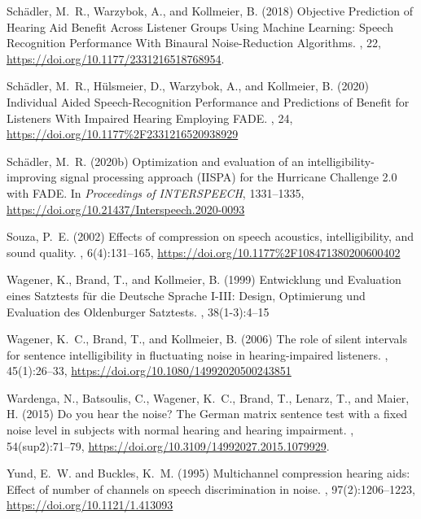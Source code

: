 \documentclass[10pt,a4paper,twocolumn]{article}
\begin{document}
\begin{thebibliography}{}
	Schädler, M.~R., Warzybok, A., and Kollmeier, B. (2018)
	\newblock Objective Prediction of Hearing Aid Benefit Across Listener Groups Using Machine Learning: Speech Recognition Performance With Binaural Noise-Reduction Algorithms.
	, 22, \url{https://doi.org/10.1177/2331216518768954}.
		
	Schädler, M.~R., Hülsmeier, D., Warzybok, A., and Kollmeier, B. (2020)
	\newblock Individual Aided Speech-Recognition Performance and Predictions of Benefit for Listeners With Impaired Hearing Employing FADE.
	, 24, \url{https://doi.org/10.1177%2F2331216520938929}
	
	Schädler, M.~R. (2020b)
	\newblock Optimization and evaluation of an intelligibility-improving signal processing approach (IISPA) for the Hurricane Challenge 2.0 with FADE.
	\newblock In {\em Proceedings of INTERSPEECH}, 1331--1335, \url{https://doi.org/10.21437/Interspeech.2020-0093}
  
	Souza, P.~E. (2002)
	\newblock Effects of compression on speech acoustics, intelligibility, and sound quality.
	, 6(4):131--165, \url{https://doi.org/10.1177%2F108471380200600402}

    Wagener, K., Brand, T., and Kollmeier, B. (1999)
    \newblock Entwicklung und Evaluation eines Satztests für die Deutsche Sprache I-III: Design, Optimierung und Evaluation des Oldenburger Satztests.
    , 38(1-3):4--15
  
    Wagener, K.~C., Brand, T., and Kollmeier, B. (2006)
    \newblock The role of silent intervals for sentence intelligibility in fluctuating noise in hearing-impaired listeners.
    , 45(1):26--33, \url{https://doi.org/10.1080/14992020500243851}
  
	Wardenga, N., Batsoulis, C., Wagener, K.~C., Brand, T., Lenarz, T., and Maier, H. (2015)
	\newblock Do you hear the noise? The German matrix sentence test with a fixed noise level in subjects with normal hearing and hearing impairment.
	, 54(sup2):71--79, \url{https://doi.org/10.3109/14992027.2015.1079929}.
  
	Yund, E.~W. and Buckles, K.~M. (1995)
	\newblock Multichannel compression hearing aids: Effect of number of channels on speech discrimination in noise.
	, 97(2):1206--1223, \url{https://doi.org/10.1121/1.413093}
\end{thebibliography}
\end{document}
